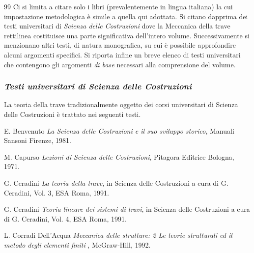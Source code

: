 \newpage




\begin{thebibliography}{99}
\makeatletter
\renewcommand{\@biblabel}[1]{}
\makeatother
\bibitem{}
\noindent Ci si limita a
citare solo i libri (prevalentemente in lingua italiana)  la cui
impostazione metodologica \`{e} simile a quella qui adottata. Si
citano dapprima dei testi universitari di \emph{Scienza delle
Costruzioni} dove la Meccanica della trave rettilinea costituisce una parte
significativa dell'intero volume. Successivamente si menzionano
altri testi, di natura  monografica, su cui \`{e} possibile
approfondire alcuni argomenti specifici. Si riporta infine un breve
elenco di testi universitari che contengono gli argomenti \emph{di
base} necessari alla comprensione del volume.
\newline


\subsubsection{ \emph{Testi universitari di
Scienza delle Costruzioni}}
 \noindent La teoria della trave  tradizionalmente oggetto
dei corsi universitari di Scienza delle Costruzioni \`{e} trattato
nei seguenti testi.

\makeatletter
\renewcommand{\@biblabel}[1]{[#1]}
\setcounter{enumiv}{0} \makeatother



E. Benvenuto {\em La Scienza delle Costruzioni e il suo sviluppo
storico}, Manuali Sansoni Firenze, 1981.


M. Capurso {\em Lezioni di Scienza delle Costruzioni}, Pitagora Editrice Bologna, 1971.





G. Ceradini {\em La teoria della trave}, in Scienza
delle Costruzioni a cura di G. Ceradini, Vol. 3, ESA Roma, 1991.


G. Ceradini {\em Teoria lineare dei sistemi di travi}, in Scienza
delle Costruzioni a cura di G. Ceradini, Vol. 4, ESA Roma, 1991.



L. Corradi Dell'Acqua {\em Meccanica delle strutture: 2 
Le teorie strutturali ed il metodo degli elementi finiti }, McGraw-Hill, 1992.


\end{thebibliography}
